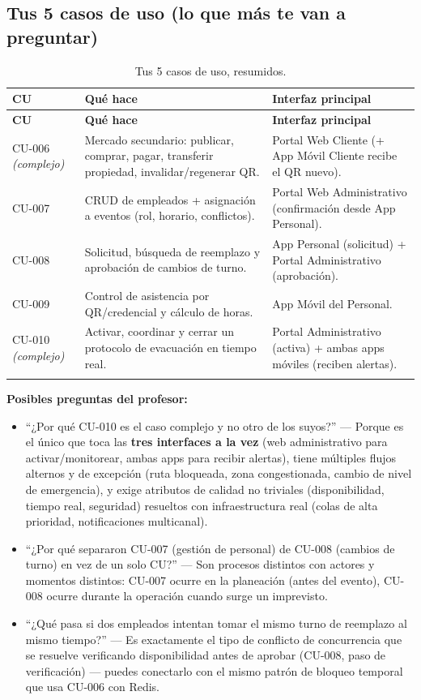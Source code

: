 \documentclass[12pt,a4paper]{article}
\begin{document}
\subsection{Tus 5 casos de uso (lo que más te van a preguntar)}

\begin{longtable}{p{2.1cm}p{5.6cm}p{5.8cm}}
\toprule
\textbf{CU} & \textbf{Qué hace} & \textbf{Interfaz principal}\\
\midrule
\endfirsthead
\toprule
\textbf{CU} & \textbf{Qué hace} & \textbf{Interfaz principal}\\
\midrule
\endhead
CU-006 \newline \textit{(complejo)} & Mercado secundario: publicar, comprar, pagar, transferir
propiedad, invalidar/regenerar QR. & Portal Web Cliente (+ App Móvil Cliente recibe el QR nuevo).\\[0.4em]
CU-007 & CRUD de empleados + asignación a eventos (rol, horario, conflictos). & Portal Web
Administrativo (confirmación desde App Personal).\\[0.4em]
CU-008 & Solicitud, búsqueda de reemplazo y aprobación de cambios de turno. & App Personal
(solicitud) + Portal Administrativo (aprobación).\\[0.4em]
CU-009 & Control de asistencia por QR/credencial y cálculo de horas. & App Móvil del Personal.\\[0.4em]
CU-010 \newline \textit{(complejo)} & Activar, coordinar y cerrar un protocolo de evacuación en
tiempo real. & Portal Administrativo (activa) + ambas apps móviles (reciben alertas).\\
\bottomrule
\caption{Tus 5 casos de uso, resumidos.}
\end{longtable}

\begin{pregunta}
\textbf{Posibles preguntas del profesor:}
\begin{itemize}
\item ``¿Por qué CU-010 es el caso complejo y no otro de los suyos?'' --- Porque es el único que
toca las \textbf{tres interfaces a la vez} (web administrativo para activar/monitorear, ambas apps
para recibir alertas), tiene múltiples flujos alternos y de excepción (ruta bloqueada, zona
congestionada, cambio de nivel de emergencia), y exige atributos de calidad no triviales
(disponibilidad, tiempo real, seguridad) resueltos con infraestructura real (colas de alta
prioridad, notificaciones multicanal).
\item ``¿Por qué separaron CU-007 (gestión de personal) de CU-008 (cambios de turno) en vez de un
solo CU?'' --- Son procesos distintos con actores y momentos distintos: CU-007 ocurre en la
planeación (antes del evento), CU-008 ocurre durante la operación cuando surge un imprevisto.
\item ``¿Qué pasa si dos empleados intentan tomar el mismo turno de reemplazo al mismo tiempo?''
--- Es exactamente el tipo de conflicto de concurrencia que se resuelve verificando disponibilidad
antes de aprobar (CU-008, paso de verificación) --- puedes conectarlo con el mismo patrón de
bloqueo temporal que usa CU-006 con Redis.
\end{itemize}
\end{pregunta}
\end{document}
